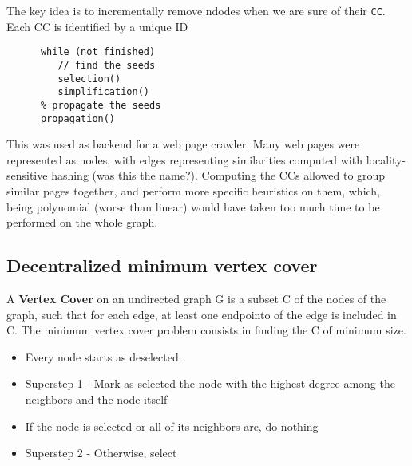 \begin{paracol}{2}
   \colfill
   The key idea is to incrementally remove ndodes when we are sure of their \texttt{CC}. 
   Each CC is identified by a unique ID
   \colfill
   \switchcolumn
   \begin{lstlisting}
      while (not finished)
         // find the seeds
         selection()
         simplification()
      % propagate the seeds
      propagation()
   \end{lstlisting}
\end{paracol}

This was used as backend for a web page crawler.
Many web pages were represented as nodes, with edges representing similarities computed with locality-sensitive hashing (was this the name?).
Computing the CCs allowed to group similar pages together, and perform more specific heuristics on them, which, being polynomial (worse than linear) would have taken too much time to be performed on the whole graph.

\subsection{Decentralized minimum vertex cover}
\begin{definition}
   A \textbf{Vertex Cover} on an undirected graph G is a subset C of the nodes of the graph, such that for each edge, at least one endpointo of the edge is included in C. The minimum vertex cover problem consists in finding the C of minimum size.
\end{definition}


\begin{itemize}
   \item Every node starts as deselected.
   \item Superstep 1 - Mark as selected the node with the highest degree among the neighbors and the node itself
   \item If the node is selected or all of its neighbors are, do nothing
   \item Superstep 2 - Otherwise, select 
\end{itemize}